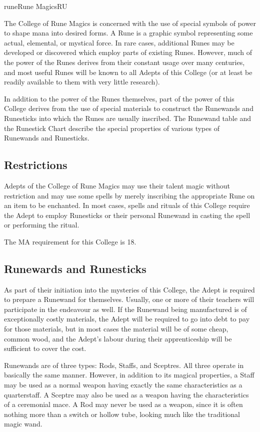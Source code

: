 \begin{college}[1.1]{rune}{Rune Magics}{RU}

The College of Rune Magics is concerned with the use of special
symbols of power to shape mana into desired forms.  A Rune is a
graphic symbol representing some actual, elemental, or mystical force.
In rare cases, additional Runes may be developed or discovered which
employ parts of existing Runes.  However, much of the power of the
Runes derives from their constant usage over many centuries, and most
useful Runes will be known to all Adepts of this College (or at least
be readily available to them with very little research).

In addition to the power of the Runes themselves, part of the power of
this College derives from the use of special materials to construct
the Runewands and Runesticks into which the Runes are usually
inscribed. The Runewand table and the Runestick Chart describe the
special properties of various types of Runewands and Runesticks.

\subsection{Restrictions}

Adepts of the College of Rune Magics may use their talent magic
without restriction and may use some spells by merely inscribing the
appropriate Rune on an item to be enchanted.  In most cases, spells
and rituals of this College require the Adept to employ Runesticks or
their personal Runewand in casting the spell or performing the ritual.

The MA requirement for this College is 18.

\subsection{Runewards and Runesticks}

As part of their initiation into the mysteries of this College, the
Adept is required to prepare a Runewand for themselves.  Usually, one or
more of their teachers will participate in the endeavour as well.  If
the Runewand being manufactured is of exceptionally costly materials,
the Adept will be required to go into debt to pay for those materials,
but in most cases the material will be of some cheap, common wood, and
the Adept's labour during their apprenticeship will be sufficient to
cover the cost.

Runewands are of three types: Rods, Staffs, and Sceptres.  All three
operate in basically the same manner.  However, in addition to its
magical properties, a Staff may be used as a normal weapon having
exactly the same characteristics as a quarterstaff.  A Sceptre may
also be used as a weapon having the characteristics of a ceremonial
mace. A Rod may never be used as a weapon, since it is often nothing
more than a switch or hollow tube, looking much like the traditional
magic wand.


\end{college}
